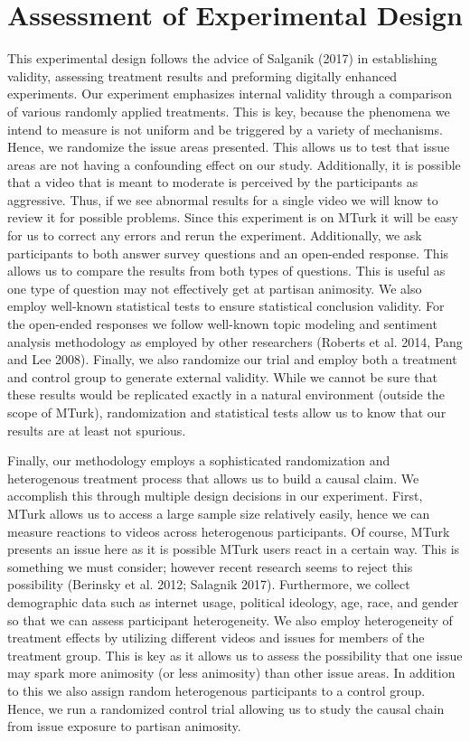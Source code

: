 \documentclass[12pt]{article}
\begin{document}
\section{Assessment of Experimental Design}

This experimental design follows the advice of Salganik (2017) in establishing validity, assessing treatment results and preforming digitally enhanced experiments. Our experiment emphasizes internal validity through a comparison of various randomly applied treatments. This is key, because the phenomena we intend to measure is not uniform and be triggered by a variety of mechanisms. Hence, we randomize the issue areas presented. This allows us to test that issue areas are not having a confounding effect on our study. Additionally, it is possible that a video that is meant to moderate is perceived by the participants as aggressive. Thus, if we see abnormal results for a single video we will know to review it for possible problems. Since this experiment is on MTurk it will be easy for us to correct any errors and rerun the experiment. Additionally, we ask participants to both answer survey questions and an open-ended response. This allows us to compare the results from both types of questions. This is useful as one type of question may not effectively get at partisan animosity. We also employ well-known statistical tests to ensure statistical conclusion validity. For the open-ended responses we follow well-known topic modeling and sentiment analysis methodology as employed by other researchers (Roberts et al. 2014, Pang and Lee 2008). Finally, we also randomize our trial and employ both a treatment and control group to generate external validity. While we cannot be sure that these results would be replicated exactly in a natural environment (outside the scope of MTurk), randomization and statistical tests allow us to know that our results are at least not spurious. 

Finally, our methodology employs a sophisticated randomization and heterogenous treatment process that allows us to build a causal claim. We accomplish this through multiple design decisions in our experiment. First, MTurk allows us to access a large sample size relatively easily, hence we can measure reactions to videos across heterogenous participants. Of course, MTurk presents an issue here as it is possible MTurk users react in a certain way. This is something we must consider; however recent research seems to reject this possibility (Berinsky et al. 2012; Salagnik 2017). Furthermore, we collect demographic data such as internet usage, political ideology, age, race, and gender so that we can assess participant heterogeneity. We also employ heterogeneity of treatment effects by utilizing different videos and issues for members of the treatment group. This is key as it allows us to assess the possibility that one issue may spark more animosity (or less animosity) than other issue areas. In addition to this we also assign random heterogenous participants to a control group. Hence, we run a randomized control trial allowing us to study the causal chain from issue exposure to partisan animosity.  

\newpage




\nocite{*}
\end{document}
